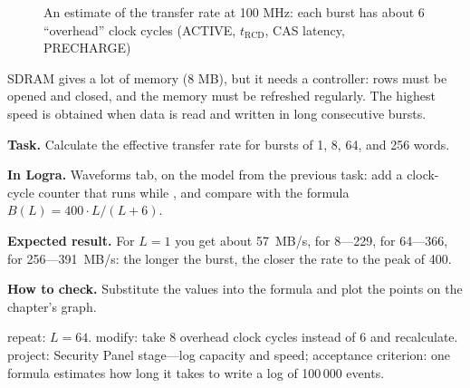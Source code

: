\begin{figure}[H]
\centering
{}
\caption{An estimate of the transfer rate at 100 MHz: each burst has about
6 ``overhead'' clock cycles (ACTIVE, $t_\text{RCD}$, CAS latency, PRECHARGE)}
\end{figure}

\begin{ideabox}
SDRAM gives a lot of memory (8 MB), but it needs a controller: rows must be
opened and closed, and the memory must be refreshed regularly. The highest
speed is obtained when data is read and written in long consecutive bursts.
\end{ideabox}

\begin{diybox}
\textbf{Task.} Calculate the effective transfer rate for bursts of 1, 8, 64, and 256 words.

\textbf{In Logra.} Waveforms tab, on the model from the previous task: add a clock-cycle counter that runs while , and compare with the formula $B(L)=400\cdot L/(L+6)$.

\textbf{Expected result.} For $L=1$ you get about 57~MB/s, for 8---229, for 64---366, for 256---391~MB/s: the longer the burst, the closer the rate to the peak of 400.

\textbf{How to check.} Substitute the values into the formula and plot the points on the chapter's graph.

 repeat: $L=64$.  modify: take 8 overhead clock cycles instead of 6 and recalculate.  project: Security Panel stage---log capacity and speed; acceptance criterion: one formula estimates how long it takes to write a log of 100\,000 events.
\end{diybox}

